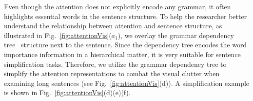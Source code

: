 Even though the attention does not explicitly encode any grammar, it often highlights essential words in the sentence structure.
%
To help the researcher better understand the relationship between attention and sentence structure, as illustrated in Fig.~\ref{fig:attentionVis}($a_{1}$), we overlay the grammar dependency tree~\cite{Nivre2005} structure next to the sentence.
%
Since the dependency tree encodes the word importance information in a hierarchical matter, it is very suitable for sentence simplification tasks.
Therefore, we utilize the grammar dependency tree to simplify the attention representations to combat the visual clutter when examining long sentences (see Fig.~\ref{fig:attentionVis}(d)).
A simplification example is shown in  Fig.~\ref{fig:attentionVis}(d)(e)(f).




